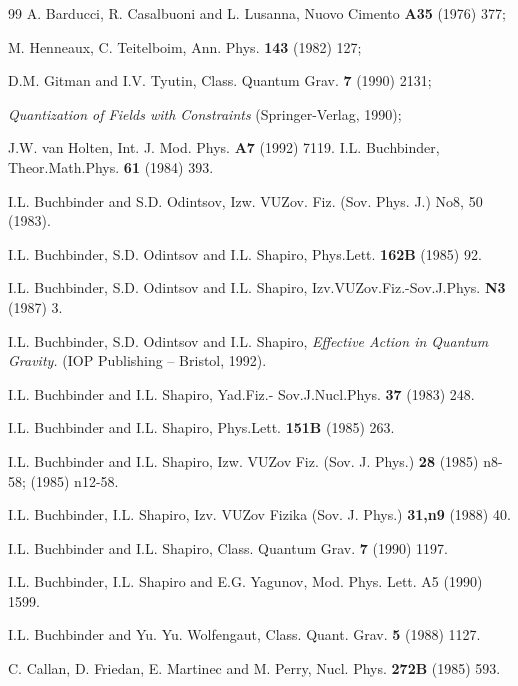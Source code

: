 \begin{thebibliography}{99}
 A. Barducci, R. Casalbuoni and L. Lusanna, Nuovo Cimento
 {\bf A35} (1976) 377; 

M. Henneaux, C. Teitelboim,
 Ann. Phys. {\bf 143} (1982) 127; 

D.M. Gitman and I.V. Tyutin,
 Class. Quantum Grav. {\bf 7} (1990) 2131;

{\sl Quantization of Fields with Constraints} (Springer-Verlag, 1990);

 J.W. van Holten, Int. J. Mod. Phys. {\bf A7} (1992) 7119.
I.L. Buchbinder,
{Theor.Math.Phys.} {\bf 61} (1984) 393.

I.L. Buchbinder and S.D. Odintsov, Izw. VUZov. Fiz. (Sov.
Phys. J.) No8,  50 (1983).

I.L. Buchbinder, S.D. Odintsov and I.L. Shapiro,
Phys.Lett. {\bf 162B} (1985) 92.

I.L. Buchbinder, S.D. Odintsov and I.L. Shapiro, 
Izv.VUZov.Fiz.-Sov.J.Phys. {\bf N3} (1987) 3.

I.L. Buchbinder, S.D. Odintsov and I.L. Shapiro,
{\sl Effective Action in Quantum Gravity.} (IOP Publishing -- Bristol,
 1992).

 I.L. Buchbinder and I.L. Shapiro,
Yad.Fiz.- Sov.J.Nucl.Phys. {\bf 37} (1983) 248.

I.L. Buchbinder and I.L. Shapiro, Phys.Lett. {\bf 151B} (1985)  263.

I.L. Buchbinder and  I.L. Shapiro,
Izw. VUZov Fiz. (Sov. J. Phys.)  {\bf 28} (1985) n8-58;
(1985) n12-58.

 I.L. Buchbinder, I.L. Shapiro,
Izv. VUZov Fizika (Sov. J. Phys.) {\bf 31,n9} (1988) 40. %

I.L. Buchbinder and I.L. Shapiro,
Class. Quantum Grav. {\bf 7} (1990) 1197.

I.L. Buchbinder, I.L. Shapiro and E.G. Yagunov,
 Mod. Phys. Lett. {A5} (1990) 1599. %

 I.L. Buchbinder and Yu. Yu. Wolfengaut,
Class. Quant. Grav. {\bf 5} (1988) 1127.

C. Callan, D. Friedan, E. Martinec and M. Perry,
Nucl. Phys. {\bf 272B} (1985) 593.


\end{thebibliography}
